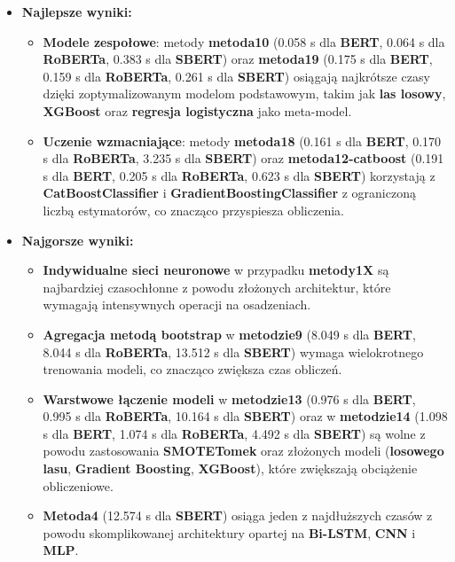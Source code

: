 \begin{itemize}
	\item \textbf{Najlepsze wyniki:}
	      \begin{itemize}
		      \item \textbf{Modele zespołowe}: metody \textbf{metoda10} (0.058 s dla \textbf{BERT}, 0.064 s dla \textbf{RoBERTa}, 0.383 s dla \textbf{SBERT}) oraz \textbf{metoda19} (0.175 s dla \textbf{BERT}, 0.159 s dla \textbf{RoBERTa}, 0.261 s dla \textbf{SBERT}) osiągają najkrótsze czasy dzięki zoptymalizowanym modelom podstawowym, takim jak \textbf{las losowy}, \textbf{XGBoost} oraz \textbf{regresja logistyczna} jako meta-model.
		      \item \textbf{Uczenie wzmacniające}: metody \textbf{metoda18} (0.161 s dla \textbf{BERT}, 0.170 s dla \textbf{RoBERTa}, 3.235 s dla \textbf{SBERT}) oraz \textbf{metoda12-catboost} (0.191 s dla \textbf{BERT}, 0.205 s dla \textbf{RoBERTa}, 0.623 s dla \textbf{SBERT}) korzystają z \textbf{CatBoostClassifier} i \textbf{GradientBoostingClassifier} z ograniczoną liczbą estymatorów, co znacząco przyspiesza obliczenia.
	      \end{itemize}
	\item \textbf{Najgorsze wyniki:}
	      \begin{itemize}
		      \item \textbf{Indywidualne sieci neuronowe} w przypadku \textbf{metody1\-X} są najbardziej czasochłonne z powodu złożonych architektur, które wymagają intensywnych operacji na osadzeniach.
		      \item \textbf{Agregacja metodą bootstrap} w \textbf{metodzie9} (8.049 s dla \textbf{BERT}, 8.044 s dla \textbf{RoBERTa}, 13.512 s dla \textbf{SBERT}) wymaga wielokrotnego trenowania modeli, co znacząco zwiększa czas obliczeń.
		      \item \textbf{Warstwowe łączenie modeli} w \textbf{metodzie13} (0.976 s dla \textbf{BERT}, 0.995 s dla \textbf{RoBERTa}, 10.164 s dla \textbf{SBERT}) oraz w \textbf{metodzie14} (1.098 s dla \textbf{BERT}, 1.074 s dla \textbf{RoBERTa}, 4.492 s dla \textbf{SBERT}) są wolne z powodu zastosowania \textbf{SMOTETomek} oraz złożonych modeli (\textbf{losowego lasu}, \textbf{Gradient Boosting}, \textbf{XGBoost}), które zwiększają obciążenie obliczeniowe.
		      \item \textbf{Metoda4} (12.574 s dla \textbf{SBERT}) osiąga jeden z najdłuższych czasów z powodu skomplikowanej architektury opartej na \textbf{Bi-LSTM}, \textbf{CNN} i \textbf{MLP}.
	      \end{itemize}
\end{itemize}

